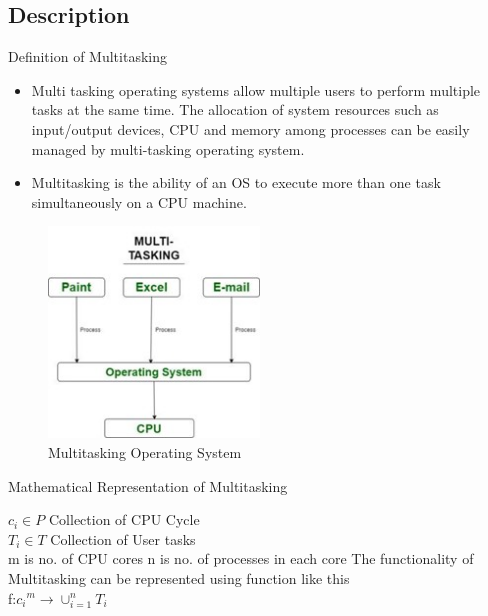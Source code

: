 \documentclass{beamer}
\begin{document}
\subsection{Description}

\begin{frame}{Definition of Multitasking}
	\begin{minipage}{5 cm}
	
	    
    \begin{itemize}
        \item Multi tasking operating systems allow multiple users to perform multiple tasks at the same time. The allocation of system resources such as input/output devices, CPU and memory among processes can be easily managed by multi-tasking operating system.
        \item Multitasking is the ability of an OS to execute more than one task simultaneously on a CPU machine.
    \end{itemize}
    \end{minipage}
    \hfill
    \begin{minipage}{8 cm}
    \begin{figure}
    
    
    	\includegraphics[width = 0.5\textwidth, height = 0.5\textheight]{Picture3}
    	\caption{Multitasking Operating System}
    	\end{figure}
    \end{minipage}
\end{frame}

\begin{frame}{Mathematical Representation of Multitasking}

$c_i\in P$ Collection of CPU Cycle\\
\vskip 0.2in
$T_i\in T$ Collection of User tasks\\
\vskip 0.2in
m is no. of CPU cores
\vskip 0.2in
n is no. of processes in each core
\vskip 0.2in
The functionality of Multitasking can be represented using function like this\\
f:${c_i}^m\rightarrow\cup_{i=1}^nT_i$

\end{frame}
\end{document}
